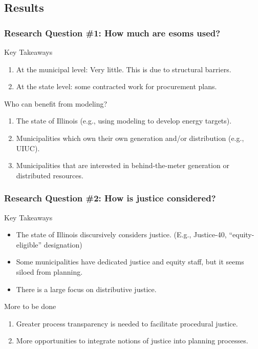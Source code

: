 \subsection{Results}
\begin{frame}
    \frametitle{Research Question \#1: How much are \glspl{esom} used?}
    \begin{block}{Key Takeaways}    
        \begin{enumerate}
            \item At the municipal level: Very little. This is due to structural barriers.
            \item At the state level: some contracted work for procurement plans.
        \end{enumerate}
    \end{block}
    \begin{block}{Who can benefit from modeling?}
        \begin{enumerate}
            \item The state of Illinois (e.g., using modeling to develop energy targets).
            \item Municipalities which own their own generation and/or distribution (e.g., UIUC).
            \item Municipalities that are interested in behind-the-meter generation or distributed resources.
        \end{enumerate}
    \end{block}
    
\end{frame}

\begin{frame}
    \frametitle{Research Question \#2: How is justice considered?}
    \begin{block}{Key Takeaways}    
        \begin{itemize}[<+->]
            \item The state of Illinois discursively considers justice. (E.g., Justice-40, ``equity-eligible'' designation)
            \item Some municipalities have dedicated justice and equity staff, but it seems siloed from planning.
            \item There is a large focus on distributive justice.
        \end{itemize}
    \end{block}
    \begin{block}{More to be done}
        \begin{enumerate}
            \item Greater process transparency is needed to facilitate procedural justice.
            \item More opportunities to integrate notions of justice into planning processes.
        \end{enumerate}
    \end{block}
\end{frame}

